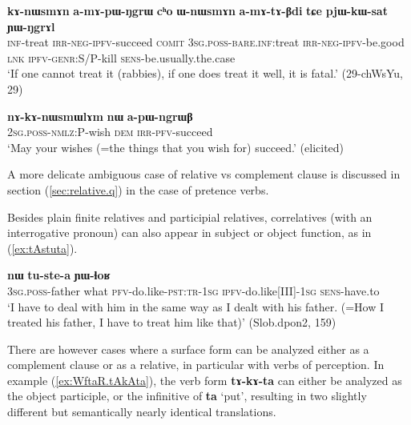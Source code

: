 \documentclass[oneside,a4paper,11pt]{article}
\newcommand{\ipa}[1]{\textbf{\phon#1}} %
\newcommand{\jpg}[2]{\ipa{#1} `#2'} %
\begin{document}
\begin{exe}
\ex \label{ex:amApWNgrW}
\gll 
\ipa{kɤ-nɯsmɤn} 	\ipa{a-mɤ-pɯ-ŋgrɯ} 	\ipa{cʰo} 	\ipa{ɯ-nɯsmɤn} 	\ipa{a-mɤ-tɤ-βdi} 	\ipa{tɕe} 	\ipa{pjɯ-kɯ-sat} 	\ipa{ɲɯ-ŋgrɤl} \\
\textsc{inf}-treat \textsc{irr-neg-ipfv}-succeed \textsc{comit} \textsc{3sg.poss-bare.inf}:treat  \textsc{irr-neg-ipfv}-be.good \textsc{lnk} \textsc{ipfv-genr:S/P}-kill \textsc{sens}-be.usually.the.case \\
\glt `If one cannot treat it (rabbies), if one does treat it well, it is fatal.' (29-chWsYu, 29)
\end{exe}

\begin{exe}
\ex \label{ex:nAkAnWsmWlAm}
\gll   \ipa{nɤ-kɤ-nɯsmɯlɤm} 	\ipa{nɯ} 	\ipa{a-pɯ-ngrɯβ} \\
\textsc{2sg.poss-nmlz:P}-wish \textsc{dem} \textsc{irr-pfv}-succeed \\
\glt `May your wishes (=the things that you wish for) succeed.' (elicited)
\end{exe}  

A more delicate ambiguous case of relative vs complement clause is discussed in section (\ref{sec:relative.q}) in the case of pretence verbs.

Besides plain finite relatives and participial relatives, correlatives (with an interrogative pronoun) can also appear in subject or object function, as in (\ref{ex:tAstuta}). 

\begin{exe}
\ex \label{ex:tAstuta}
\gll 
[\ipa{ɯ-wa} 	\ipa{tɕʰi} 	\ipa{tɤ-stu-t-a}] 	\ipa{nɯ} 	\ipa{tu-ste-a} 	\ipa{ɲɯ-ɬoʁ} \\
\textsc{3sg.poss-}father what \textsc{pfv}-do.like-\textsc{pst:tr}-\textsc{1sg} \textsc{ipfv}-do.like[III]-\textsc{1sg} \textsc{sens}-have.to \\
\glt `I have to deal with him in the same way as I dealt with his father. (=How I treated his father, I have to treat him like that)' (Slob.dpon2, 159)
\end{exe}

There are however cases where a surface form can be analyzed either as a complement clause or as a relative, in particular with verbs of perception. In example (\ref{ex:WftaR.tAkAta}), the verb form \ipa{tɤ-kɤ-ta} can either be analyzed as the object participle, or the infinitive of \jpg{ta}{put}, resulting in two slightly different but semantically nearly identical translations.
\end{document}
